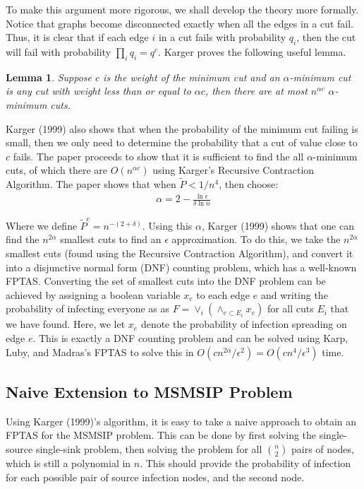 \documentclass{article}
\theoremstyle{plain}
\newtheorem{lemma}{Lemma}
\begin{document}
To make this argument more rigorous, we shall develop the theory more formally. Notice that graphs become disconnected exactly when all the edges in a cut fail. Thus, it is clear that if each edge $i$ in a cut fails with probability $q_i$, then the cut will fail with probability $\prod_i q_i = q^c$. Karger proves the following useful lemma.

\begin{lemma}
  Suppose $c$ is the weight of the minimum cut and an $\alpha$-minimum cut is any cut with weight less than or equal to $\alpha c$, then there are at most $n^{\alpha c}$ $\alpha$-minimum cuts.
\end{lemma}

Karger (1999) also shows that when the probability of the minimum cut failing is small, then we only need to determine the probability that a cut of value close to $c$ fails. The paper proceeds to show that it is sufficient to find the all $\alpha$-minimum cuts, of which there are $O(n^{\alpha c})$ using Karger's Recursive Contraction Algorithm. The paper shows that when $\tilde{P} < 1/n^4$, then choose:
\begin{eqnarray}
  \alpha = 2 - \frac{\ln \epsilon}{\delta \ln n}
\end{eqnarray}

Where we define $\tilde{P}^c = n^{-(2 + \delta)}$. Using this $\alpha$, Karger (1999) shows that one can find the $n^{2 \alpha}$ smallest cuts to find an $\epsilon$ approximation. To do this, we take the $n^{2 \alpha}$ smallest cuts (found using the Recursive Contraction Algorithm), and convert it into a disjunctive normal form (DNF) counting problem, which has a well-known FPTAS. Converting the set of smallest cuts into the DNF problem can be achieved by assigning a boolean variable $x_e$ to each edge $e$ and writing the probability of infecting everyone as as $F = \vee_i (\wedge_{e \subset E_i} x_e)$ for all cuts $E_i$ that we have found. Here, we let $x_e$ denote the probability of infection spreading on edge $e$. This is exactly a DNF counting problem and can be solved using Karp, Luby, and Madras's FPTAS to solve this in $O(c n^{2 \alpha} / \epsilon^2) = O(c n^4 / \epsilon^3)$ time.

\subsection{Naive Extension to MSMSIP Problem}

Using Karger (1999)'s algorithm, it is easy to take a naive approach to obtain an FPTAS for the MSMSIP problem. This can be done by first solving the single-source single-sink problem, then solving the problem for all ${n \choose 2}$ pairs of nodes, which is still a polynomial in $n$. This should provide the probability of infection for each possible pair of source infection nodes, and the second node.
\end{document}
